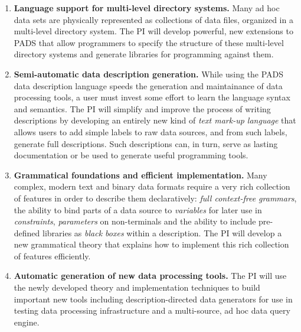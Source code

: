 \begin{enumerate}
\item {\bf Language support for multi-level directory systems.}
Many ad hoc data sets are physically represented as collections of 
data files, organized in a multi-level directory system.
The PI will develop powerful, new extensions to PADS that allow programmers
to specify the structure of these multi-level directory systems
and generate libraries for programming against them.
\item {\bf Semi-automatic data description generation.}
While using the PADS data description language speeds the generation
and maintainance of data processing tools, a user must invest some effort
to learn the language syntax and semantics.  The PI will simplify
and improve the process of writing descriptions by developing 
an entirely new kind of {\em text mark-up language} that 
allows users to add simple
labels to raw data sources, and from such labels, generate full descriptions.
Such descriptions can, in turn, serve as lasting documentation or be 
used %
to generate useful programming tools.
\item {\bf Grammatical foundations and efficient implementation.}  
Many complex, modern text and binary data formats require a very rich collection
of features in order to describe them declaratively:  
{\em full context-free grammars}, the ability to bind 
parts of a data source to {\em variables} for later use in
{\em constraints}, {\em parameters} on non-terminals and the
ability to include pre-defined libraries as {\em black boxes} 
within a description.  The PI will develop a new grammatical 
theory that explains how to implement this rich collection of features
efficiently.  
\item {\bf Automatic generation of new data processing tools.} 
The PI will use the newly developed theory and implementation techniques 
to build important new tools including description-directed 
data generators for use in testing data processing infrastructure
and a multi-source, ad hoc data query engine.
\end{enumerate}

